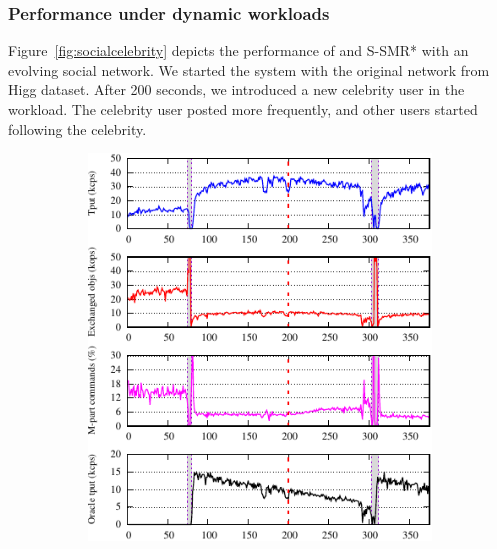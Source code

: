 \subsubsection{Performance under dynamic workloads}

Figure~\ref{fig:socialcelebrity} depicts the performance of \dynastar and S-SMR* with an evolving social network.
We started the system with the original network from Higg dataset. After 200 seconds, we introduced a new celebrity user in the workload.
The celebrity user posted more frequently, and
other users started following the celebrity.

\begin{figure}[ht!]
  \centering
  \begin{subfigure}{.48\textwidth}
    \centering
    \includegraphics[width=\textwidth]{./figures/experiments/dynastar/chirper-celeb-dynastar.pdf}
    \caption{}
  \end{subfigure}
  \begin{subfigure}{.48\textwidth}
    \centering

\end{subfigure}
\end{figure}
